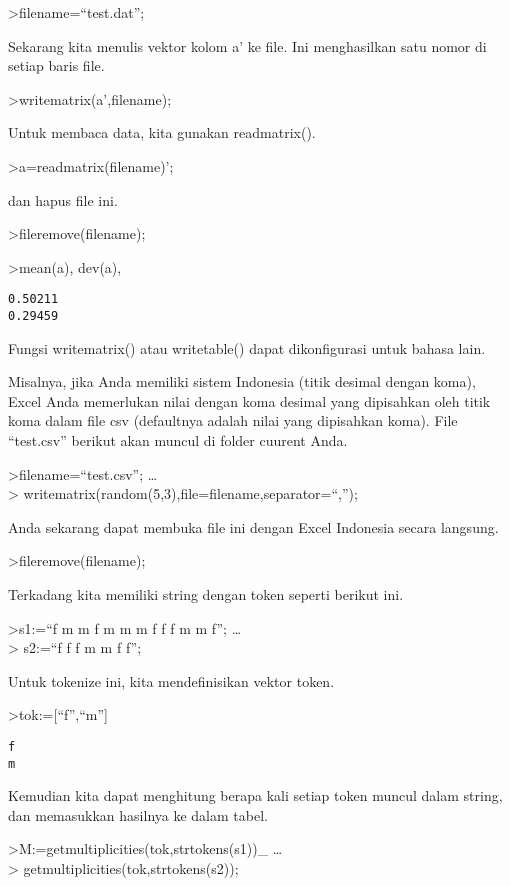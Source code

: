 \documentclass[
]{book}
\begin{document}
\textgreater filename=``test.dat'';

Sekarang kita menulis vektor kolom a' ke file. Ini menghasilkan satu nomor di setiap baris file.

\textgreater writematrix(a',filename);

Untuk membaca data, kita gunakan readmatrix().

\textgreater a=readmatrix(filename)';

dan hapus file ini.

\textgreater fileremove(filename);

\textgreater mean(a), dev(a),

\begin{verbatim}
0.50211
0.29459
\end{verbatim}

Fungsi writematrix() atau writetable() dapat dikonfigurasi untuk bahasa lain.

Misalnya, jika Anda memiliki sistem Indonesia (titik desimal dengan koma), Excel Anda memerlukan nilai dengan koma desimal yang dipisahkan oleh titik koma dalam file csv (defaultnya adalah nilai yang dipisahkan koma). File ``test.csv'' berikut akan muncul di folder cuurent Anda.

\textgreater filename=``test.csv''; \ldots{}\\
\textgreater{} writematrix(random(5,3),file=filename,separator=``,'');

Anda sekarang dapat membuka file ini dengan Excel Indonesia secara langsung.

\textgreater fileremove(filename);

Terkadang kita memiliki string dengan token seperti berikut ini.

\textgreater s1:=``f m m f m m m f f f m m f''; \ldots{}\\
\textgreater{} s2:=``f f f m m f f'';

Untuk tokenize ini, kita mendefinisikan vektor token.

\textgreater tok:={[}``f'',``m''{]}

\begin{verbatim}
f
m
\end{verbatim}

Kemudian kita dapat menghitung berapa kali setiap token muncul dalam string, dan memasukkan hasilnya ke dalam tabel.

\textgreater M:=getmultiplicities(tok,strtokens(s1))\_ \ldots{}\\
\textgreater{} getmultiplicities(tok,strtokens(s2));
\end{document}
